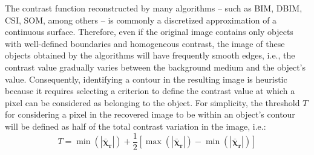 \documentclass{IEEEtran}
\newcommand{\Xr}{\boldsymbol{\bar{\chi}_r}}
\begin{document}
			
			The contrast function reconstructed by many algorithms -- such as BIM, DBIM, CSI, SOM, among others -- is commonly a discretized approximation of a continuous surface. Therefore, even if the original image contains only objects with well-defined boundaries and homogeneous contrast, the image of these objects obtained by the algorithms will have frequently smooth edges, i.e., the contrast value gradually varies between the background medium and the object's value. Consequently, identifying a contour in the resulting image is heuristic because it requires selecting a criterion to define the contrast value at which a pixel can be considered as belonging to the object. For simplicity, the threshold $T$ for considering a pixel in the recovered image to be within an object's contour will be defined as half of the total contrast variation in the image, i.e.:
			\begin{equation}
				T = \min(|\Xr|) + \frac{1}{2} \left[\max(|\Xr|)-\min(|\Xr|)\right]
			\end{equation}
		
			
\end{document}
